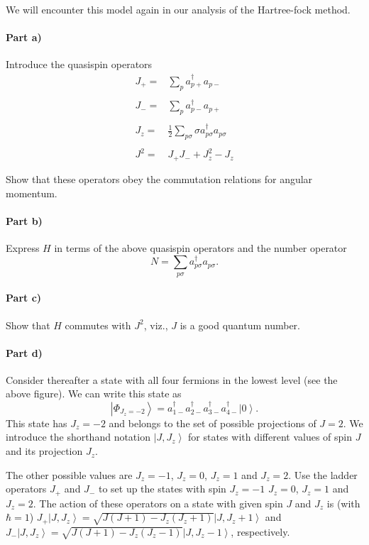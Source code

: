 \documentclass[prc]{revtex4}
\newcommand{\ket}[1]{\left| #1 \right\rangle}
\begin{document}
We will encounter this model again in our analysis of the Hartree-fock method. 


\paragraph{Part a)}
Introduce the quasispin operators
\[
\begin{array}{ll}
J_{+}=&\sum_{p}
a_{p+}^{\dagger}a_{p-}\\
&\\
J_{-}=&\sum_{p}
a_{p-}^{\dagger}a_{p+}\\
&\\
J_{z}=&\frac{1}{2}\sum_{p\sigma}\sigma
a_{p\sigma}^{\dagger}a_{p\sigma}\\
&\\
J^{2}=&J_{+}J_{-}+J_{z}^{2}-J_{z}\\
&\\
\end{array}
\]
Show that these operators obey the commutation relations for angular momentum.
\paragraph{Part b)}
Express $H$ in terms of the above quasispin operators and the number operator
\[
N=\sum_{p\sigma}
a_{p\sigma}^{\dagger}a_{p\sigma}.
\]
\paragraph{Part c)}
Show that $H$ commutes with $J^{2}$, viz., $J$ is a good quantum number.
\paragraph{Part d)}
Consider thereafter a state with all four fermions in the lowest level (see the above figure).
We can write this state as
\[
\ket{\Phi_{J_z=-2}} =a_{1-}^{\dagger}a_{2-}^{\dagger}
a_{3-}^{\dagger}a_{4-}^{\dagger}\ket{0}.
\]
This state has $J_{z}=-2$ and belongs to the set of possible projections of 
$J=2$. We introduce the shorthand notation
$\ket{J,J_z}$ for states with different values of
spin $J$ and its projection $J_z$.

The other possible values are  $J_{z}=-1$, $J_{z}=0$, $J_{z}=1$
and $J_{z}=2$. 
Use the ladder operators
$J_{+}$ and $J_{-}$  to set up the states 
with spin $J_{z}=-1$ $J_{z}=0$, $J_{z}=1$
and $J_{z}=2$.  
The action of these operators on a state with given spin 
$J$ and $J_z$ is  (with $\hbar = 1$) 
$J_+\ket{J,J_z}=\sqrt{J(J+1)-J_z(J_z+1)}\ket{J,J_z+1}$ and
$J_-\ket{J,J_z}=\sqrt{J(J+1)-J_z(J_z-1)}\ket{J,J_z-1}$, respectively.
\end{document}
